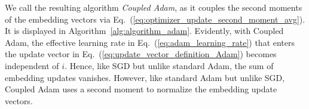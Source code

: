 We call the resulting algorithm \textit{Coupled Adam}, as it couples the second moments of the embedding vectors via Eq.~(\ref{eq:optimizer_update_second_moment_avg}). 
It is displayed in Algorithm~\ref{alg:algorithm_adam}.
Evidently, with Coupled Adam, the effective learning rate in Eq.~(\ref{eq:adam_learning_rate}) that enters the update vector in Eq.~(\ref{eq:update_vector_definition_Adam}) becomes independent of $i$. Hence, like SGD but unlike standard Adam, the sum of embedding updates vanishes.
However, like standard Adam but unlike SGD, Coupled Adam uses a second moment to normalize the embedding update vectors. 
